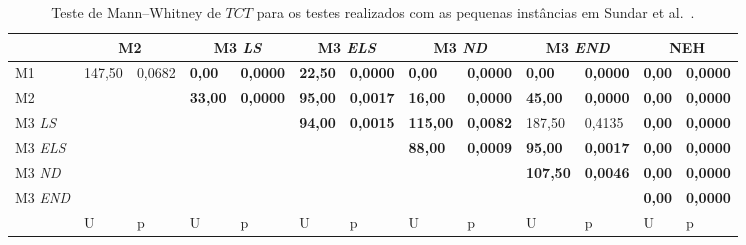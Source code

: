 \begin{table}[H]
\caption{Teste de Mann–Whitney de $TCT$ para os testes realizados com as pequenas instâncias em Sundar et al.~\cite{sundarHybridArtificialBee2017}.}
\label{tab:P2_hipothesis_TCT}
\setlength{\tabcolsep}{3pt} %
\begin{tabular}{l|ll|ll|ll|ll|ll|ll}
                                 & \multicolumn{2}{c|}{M2} & \multicolumn{2}{c|}{M3 \textit{LS}} & \multicolumn{2}{c|}{M3 \textit{ELS}} & \multicolumn{2}{c|}{M3 \textit{ND}} & \multicolumn{2}{c|}{M3 \textit{END}} & \multicolumn{2}{c}{NEH}         \\ \hline
M1                               & 147,50     & 0,0682     & \textbf{0,00}            & \textbf{0,0000}           & \textbf{22,50}            & \textbf{0,0000}           & \textbf{0,00}             & \textbf{0,0000}          & \textbf{0,00}             & \textbf{0,0000}           & \textbf{0,00} & \textbf{0,0000} \\
M2                               & \textbf{}  & \textbf{}  & \textbf{33,00}           & \textbf{0,0000}           & \textbf{95,00}            & \textbf{0,0017}           & \textbf{16,00}            & \textbf{0,0000}          & \textbf{45,00}            & \textbf{0,0000}           & \textbf{0,00} & \textbf{0,0000} \\
M3 \textit{LS}  & \textbf{}  & \textbf{}  & \textbf{}                & \textbf{}                 & \textbf{94,00}            & \textbf{0,0015}           & \textbf{115,00}           & \textbf{0,0082}          & 187,50                    & 0,4135                    & \textbf{0,00} & \textbf{0,0000} \\
M3 \textit{ELS} & \textbf{}  & \textbf{}  & \textbf{}                & \textbf{}                 & \textbf{}                 & \textbf{}                 & \textbf{88,00}            & \textbf{0,0009}          & \textbf{95,00}            & \textbf{0,0017}           & \textbf{0,00} & \textbf{0,0000} \\
M3 \textit{ND}  & \textbf{}  & \textbf{}  & \textbf{}                & \textbf{}                 & \textbf{}                 & \textbf{}                 & \textbf{}                 & \textbf{}                & \textbf{107,50}           & \textbf{0,0046}           & \textbf{0,00} & \textbf{0,0000} \\
M3 \textit{END} & \textbf{}  & \textbf{}  & \textbf{}                & \textbf{}                 & \textbf{}                 & \textbf{}                 & \textbf{}                 & \textbf{}                & \textbf{}                 & \textbf{}                 & \textbf{0,00} & \textbf{0,0000} \\ \hline
                                 & U          & p          & U                        & p                         & U                         & p                         & U                         & p                        & U                         & p                         & U             & p              
\end{tabular}
\end{table}

